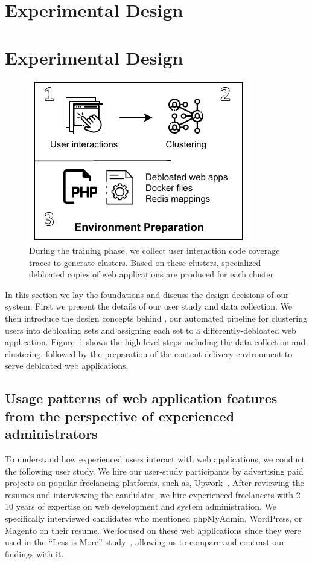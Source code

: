\section{Experimental Design}\section{Experimental Design}
\label{sec:experiment-design}

\begin{figure}[t]
    \centering
    \includegraphics[]{figures/dbltr/EnvironmentPreparation.pdf}
    \caption{During the training phase, we collect user interaction code coverage traces to generate clusters. Based on these clusters, specialized debloated copies of web applications are produced for each cluster.}
    \label{fig:environment_preparation}
\end{figure}

In this section we lay the foundations and discuss the design decisions of our system. 
First we present the details of our user study and data collection. 
We then introduce the design concepts behind \dbltr{}, our automated pipeline for clustering users into debloating sets and assigning each set to a differently-debloated web application.
Figure~\ref{fig:environment_preparation} shows the high level steps including the data collection and clustering, followed by the preparation of the content delivery environment to serve debloated web applications.

\subsection{Usage patterns of web application features from the perspective of experienced administrators}

To understand how experienced users interact with web applications, we conduct the following user study. 
We hire our user-study participants by advertising paid projects on popular freelancing platforms, such as, Upwork~\cite{upwork}. 
After reviewing the resumes and interviewing the candidates, we hire experienced freelancers with 2-10 years of expertise on web development and system administration. 
We specifically interviewed candidates who mentioned phpMyAdmin, WordPress, or Magento on their resume. 
We focused on these web applications since they were used in the ``Less is More'' study~\cite{lessismore}, allowing us to compare and contrast our findings with it. 

